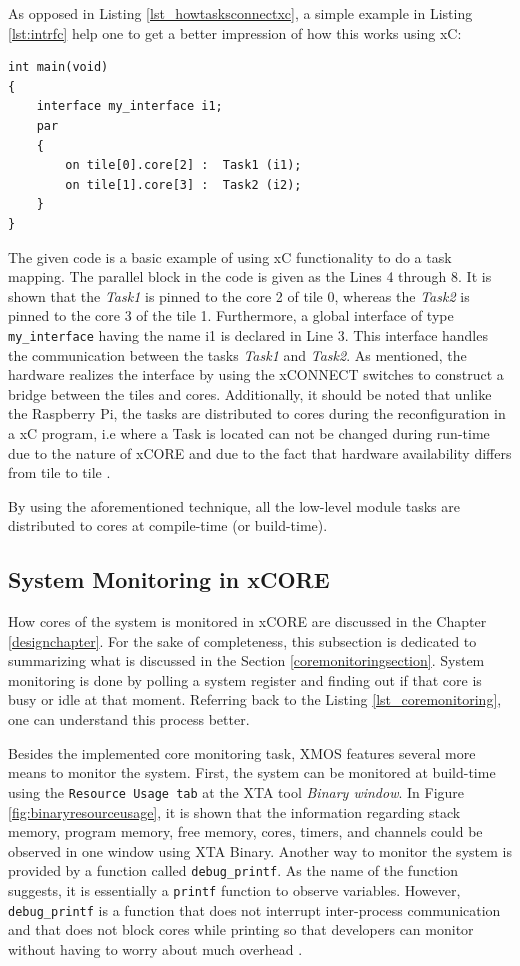 As opposed in Listing \ref{lst_howtasksconnectxc}, a simple example in Listing \ref{lst:intrfc} help one to get a better impression of how this works using xC:
\newpage
\begin{lstlisting}[caption={Interfacing in XMOS},label={lst:intrfc},style=xc]
int main(void)
{
	interface my_interface i1;
	par
	{
		on tile[0].core[2] :  Task1 (i1);
		on tile[1].core[3] :  Task2 (i2);
	}
}
\end{lstlisting}

The given code is a basic example of using xC functionality to do a task mapping. The parallel block in the code is given as the Lines 4 through 8. It is shown that the \textit{Task1} is pinned to the core 2 of tile 0, whereas the \textit{Task2} is pinned to the core 3 of the tile 1. Furthermore, a global interface of type \texttt{my\texttt{\_}interface} having the name i1 is declared in Line 3. This interface handles the communication between the tasks \textit{Task1} and \textit{Task2}. As mentioned, the hardware realizes the interface by using the xCONNECT switches to construct a bridge between the tiles and cores. Additionally, it should be noted that unlike the Raspberry Pi, the tasks are distributed to cores during the reconfiguration in a xC program, i.e where a Task is located can not be changed during run-time due to the nature of xCORE and due to the fact that hardware availability differs from tile to tile \cite{xmosprogrguide}.

By using the aforementioned technique, all the low-level module tasks are distributed to cores at compile-time (or build-time). 

\subsection{System Monitoring in xCORE}
How cores of the system is monitored in xCORE are discussed in the Chapter \ref{designchapter}. For the sake of completeness, this subsection is dedicated to summarizing what is discussed in the Section \ref{coremonitoringsection}. System monitoring is done by polling a system register and finding out if that core is busy or idle at that moment. Referring back to the Listing  \ref{lst_coremonitoring}, one can understand this process better.

Besides the implemented core monitoring task, XMOS features several more means to monitor the system. First, the system can be monitored at build-time using the \texttt{Resource Usage tab} at the XTA tool \textit{Binary window}. In Figure \ref{fig:binaryresourceusage}, it is shown that the information regarding stack memory, program memory, free memory, cores, timers, and channels could be observed in one window using XTA Binary. Another way to monitor the system is provided by a function called \texttt{debug\texttt{\_}printf}. As the name of the function suggests, it is essentially a \texttt{printf} function to observe variables. However, \texttt{debug\texttt{\_}printf} is a function that does not interrupt inter-process communication and that does not block cores while printing so that developers can monitor without having to worry about much overhead \cite{xmosprogrguide}.

